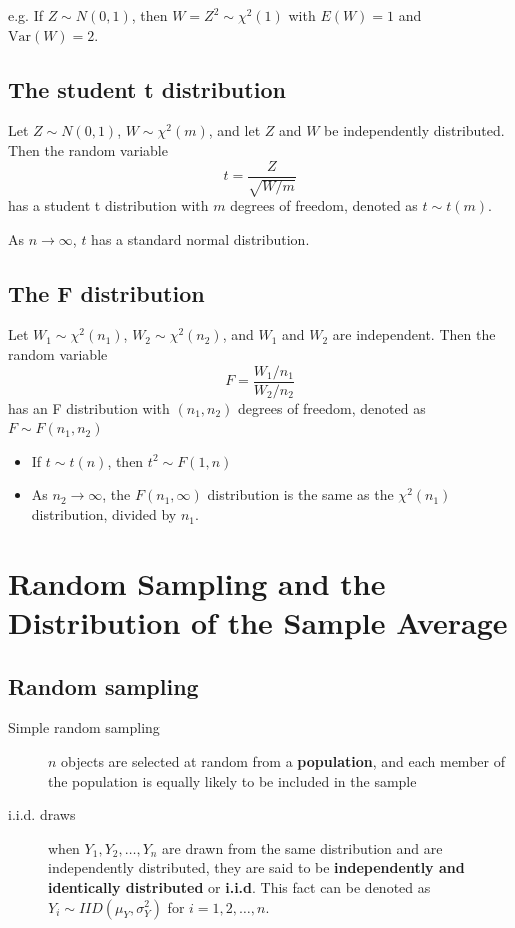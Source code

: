 \documentclass[a4paper,11pt]{article}
\newcommand{\var}{\mathrm{Var}}
\begin{document}
e.g. If \(Z \sim N(0, 1)\), then \(W = Z^2 \sim \chi^2(1)\) with \(E(W) =
1\) and \(\var(W) = 2\).

\subsection{The student t distribution}
\label{sec:org946965d}
Let \(Z \sim N(0, 1)\), \(W \sim \chi^2(m)\), and let \(Z\) and \(W\) be
independently distributed. Then the random variable
\[t = \frac{Z}{\sqrt{W/m}} \]
has a student t distribution with \(m\) degrees of freedom, denoted as
\(t \sim t(m)\).

As \(n \rightarrow \infty\), \(t\) has a standard normal distribution.

\subsection{The F distribution}
\label{sec:orgebf0ed3}
Let \(W_1 \sim \chi^2(n_1)\), \(W_2 \sim \chi^2(n_2)\), and \(W_1\) and
\(W_2\) are independent. Then the random variable
\[ F = \frac{W_1/n_1}{W_2/n_2}\]
has an F distribution with \((n_1, n_2)\) degrees of freedom, denoted as
\(F \sim F(n_1, n_2)\)

\begin{itemize}
\item If \(t \sim t(n)\), then \(t^2 \sim F(1, n)\)
\item As \(n_2 \rightarrow \infty\), the \(F(n_1, \infty)\) distribution is the
same as the \(\chi^2(n_1)\) distribution, divided by \(n_1\).
\end{itemize}


\section{Random Sampling and the Distribution of the Sample Average}
\label{sec:org2aa0f54}
\subsection{Random sampling}
\label{sec:orgfd9198a}
\begin{description}
\item[{Simple random sampling}] \(n\) objects are selected at random from a
\textbf{population}, and each member of the population is equally likely
to be included in the sample

\item[{i.i.d. draws}] when \(Y_1, Y_2, \ldots, Y_n\) are drawn from the same
distribution and are independently distributed, they
are said to be \textbf{independently and identically
distributed} or \textbf{i.i.d}. This fact can be denoted as
\(Y_i \sim IID(\mu_Y, \sigma^2_Y)\) for \(i = 1, 2,
                  \ldots, n\).
\end{description}
\end{document}
